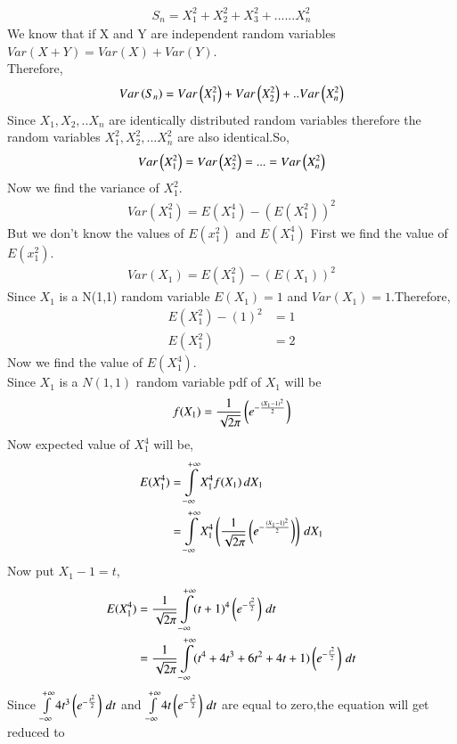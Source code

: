 \documentclass[journal,12pt,twocolumn]{IEEEtran}
\begin{document}
\begin{align}
    S_{n}=X_{1}^2+X_{2}^2+X_{3}^2+......X_{n}^2
\end{align}
We know that if X and Y are independent random variables $Var(X+Y)=Var(X)+Var(Y)$.
\\Therefore,
\begin{align}
    Var\left(S_{n}\right)=Var\left(X_{1}^2\right)+Var\left(X_{2}^2\right)+..Var\left(X_{n}^2\right)
\end{align}
Since $X_{1},X_{2},..X_{n}$ are identically distributed random variables therefore the random variables $X_{1}^2,X_{2}^2,...X_{n}^2$ are also identical.So,
\begin{align}
    Var\left(X_{1}^2\right)=Var\left(X_{2}^2\right)=...=Var\left(X_{n}^2\right)
\end{align}
Now we find the variance of $X_{1}^2$.
\begin{align}
    Var(X_{1}^2)=E(X_{1}^4)-(E(X_{1}^2))^2
\end{align}
But we don't know the values of $E(x_{1}^2)$ and $E(X_{1}^4)$
First we find the value of $E(x_{1}^2)$. 
\begin{align}
    Var(X_{1})=E(X_{1}^2)-(E(X_{1}))^2
\end{align}
Since $X_{1}$ is a N(1,1) random variable $E(X_{1})=1$ and $Var(X_{1})=1$.Therefore,
\begin{align}
    E(X_{1}^2)-(1)^2&=1
 \\  E(X_{1}^2)&=2
\end{align}
Now we find the value of $E(X_{1}^4)$.
\\Since $X_{1}$ is a $N(1,1)$ random variable pdf of $X_{1}$ will be 
\begin{align}
    f(X_{1})=\frac{1}{\sqrt{2\pi}}\left(e^{-\frac{(X_{1}-1)^2}{2}}\right)
\end{align}
Now expected value of $X_{1}^{4}$ will be,
\begin{align}
   E(X_{1}^4)&=\int\limits_{-\infty}^{+\infty}X_{1}^{4}f(X_{1})\,dX_{1}
\\   &=\int\limits_{-\infty}^{+\infty}X_{1}^{4}\left(\frac{1}{\sqrt{2\pi}}\left(e^{-\frac{(X_{1}-1)^2}{2}}\right)\right)\,dX_{1}
\end{align}
Now put $X_{1}-1=t$,
\begin{align}
    E(X_{1}^4)&=\frac{1}{\sqrt{2\pi}}\int\limits_{-\infty}^{+\infty}(t+1)^{4}\left(e^{-\frac{t^{2}}{2}}\right)\,dt
\\ &=\frac{1}{\sqrt{2\pi}}\int\limits_{-\infty}^{+\infty}(t^{4}+4t^{3}+6t^{2}+4t+1)\left(e^{-\frac{t^{2}}{2}}\right)\,dt
\end{align}
Since $\int\limits_{-\infty}^{+\infty}4t^3\left(e^{-\frac{t^{2}}{2}}\right)\,dt$ and $\int\limits_{-\infty}^{+\infty}4t\left(e^{-\frac{t^{2}}{2}}\right)\,dt$ are equal to zero,the equation will get reduced to
\end{document}
